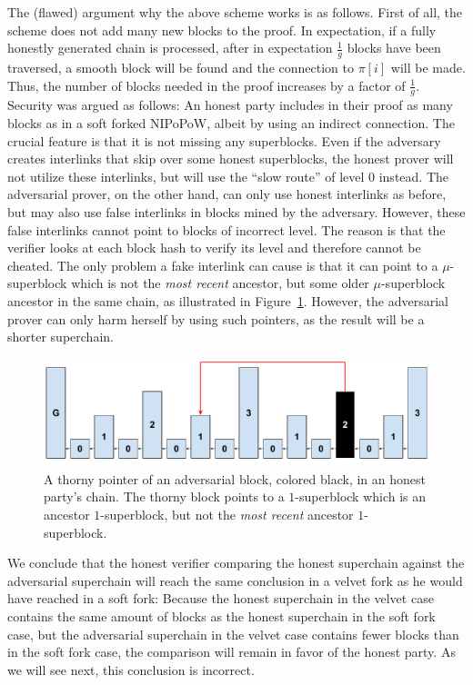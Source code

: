 The (flawed) argument   why the above scheme works is as follows. First of all, the
scheme does not add many new blocks to the proof. In expectation, if a fully
honestly generated chain is processed, after in expectation $\frac{1}{g}$ blocks
have been traversed, a smooth block will be found and the connection to $\pi[i]$
will be made. Thus, the number of blocks needed in the proof increases by a
factor of $\frac{1}{g}$. Security was argued as follows: An honest party
includes in their proof as many blocks as in a soft forked NIPoPoW, albeit by
using an indirect connection. The crucial feature is that it is not missing any
superblocks. Even if the adversary creates interlinks that skip over some honest
superblocks, the honest prover will not utilize these interlinks, but will use
the ``slow route'' of level $0$ instead. The adversarial prover, on the other
hand, can only use honest interlinks as before, but may also use false
interlinks in blocks mined by the adversary. However, these false
interlinks cannot point to blocks of incorrect level. The reason is
that the verifier looks at each block hash to verify its level and
therefore cannot be cheated. The only problem a fake interlink can cause is that
it can point to a $\mu$-superblock which is not the \emph{most recent} ancestor,
but some older $\mu$-superblock ancestor in the same chain,
as illustrated in Figure~\ref{fig:skip_ancestor}. However, the adversarial
prover can only harm herself by using such pointers, as the result will
be a shorter superchain.

\begin{figure}
	\begin{center}
		\includegraphics[width=0.8\columnwidth]{figures/simple_thorny.pdf}
	\end{center}
    \caption{A thorny pointer of an adversarial block, colored black, in an honest party's chain. The thorny block points to a $1$-superblock which is an ancestor
		$1$-superblock, but not the \emph{most recent} ancestor $1$-superblock.}
	\label{fig:skip_ancestor}
\end{figure}

We conclude that the honest verifier comparing the honest superchain
against the adversarial superchain will reach the same conclusion in a velvet
fork as he would have reached in a soft fork: Because the honest
superchain in the velvet case contains the same amount of blocks as the honest
superchain in the soft fork case, but the adversarial superchain in the velvet
case contains fewer blocks than in the soft fork case, the comparison will
remain in favor of the honest party. As we will see next, this
conclusion is incorrect.
